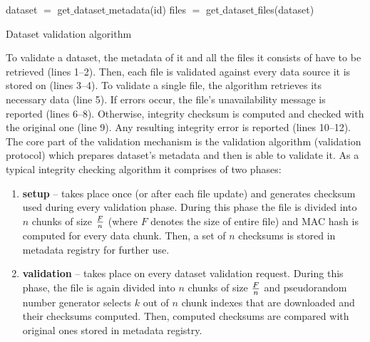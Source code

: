 \begin{algorithm}[H]
	\SetLine
	\linesnumbered
	dataset $=$ get$\_$dataset$\_$metadata(id)\;
	files $=$ get$\_$dataset$\_$files(dataset)\;
\caption{Dataset validation algorithm}
\end{algorithm}

To validate a dataset, the metadata of it and all the files it consists of
have to be retrieved (lines 1--2). Then, each file is validated against every
data source it is stored on (lines 3--4). To validate a single file, the
algorithm retrieves its necessary data (line 5). If errors occur, the file's
unavailability message is reported (lines 6--8). Otherwise, integrity checksum
is computed and checked with the original one (line 9). Any resulting integrity
error is reported (lines 10--12).\\

The core part of the validation mechanism is the validation algorithm
(validation protocol) which prepares dataset's metadata and then is able to
validate it. As a typical integrity checking algorithm it comprises of two 
phases: 

\begin{enumerate}
	\item \textbf{setup} -- takes place once (or after each file update) and 
	generates checksum used during every validation phase. During this
	phase the file is divided into $n$ chunks of size $F \over n$ (where $F$
	denotes the size of entire file) and MAC hash is computed for every data
	chunk. Then, a set of $n$ checksums is stored in metadata registry for
	further use.
	\item \textbf{validation} -- takes place on every dataset validation 
	request. During this phase, the file is again divided into $n$ chunks of size $F \over n$ and
	pseudorandom number generator selects $k$ out of $n$ chunk indexes that are
	downloaded and their checksums computed. Then, computed checksums are
	compared with original ones stored in metadata registry.
\end{enumerate}

